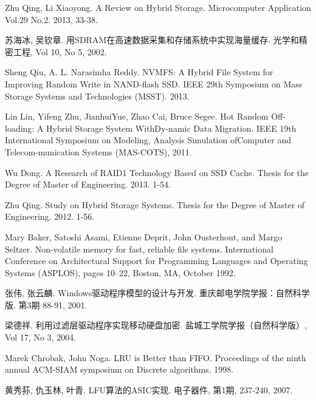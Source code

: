 \begin{thebibliography}
Zhu Qing, Li Xiaoyong. A Review on Hybrid Storage. Microcomputer Application Vol.29 No.2. 2013, 33-38.

苏海冰, 吴钦章. 用SDRAM在高速数据采集和存储系统中实现海量缓存. 光学和精密工程, Vol 10, No 5, 2002.

Sheng Qiu, A. L. Narasimha Reddy. NVMFS: A Hybrid File System for Improving Random Write in NAND-flash SSD. IEEE 29th Symposium on Mass Storage Systems and Technologies (MSST). 2013.

Lin Lin, Yifeng Zhu, JianhuiYue, Zhao Cai, Bruce Segee. Hot Random Off-loading: A Hybrid Storage System WithDy-namic Data Migration. IEEE 19th International Symposium on Modeling, Analysis Simulation ofComputer and Telecom-munication Systems (MAS-COTS), 2011.

Wu Dong. A Research of RAID1 Technology Based on SSD Cache. Thesis for the Degree of Master of Engineering. 2013. 1-54.

Zhu Qing. Study on Hybrid Storage Systems. Thesis for the Degree of Master of Engineering. 2012. 1-56.

Mary Baker, Satoshi Asami, Etienne Deprit, John Ousterhout, and Margo Seltzer. Non-volatile memory for fast, reliable file systems. International Conference on Architectural Support for Programming Languages and Operating Systems (ASPLOS), pages 10–22, Boston, MA, October 1992.

张伟, 张云麟. Windows驱动程序模型的设计与开发. 重庆邮电学院学报：自然科学版. 第3期 88-91, 2001.

梁德祥. 利用过滤层驱动程序实现移动硬盘加密. 盐城工学院学报（自然科学版）, Vol 17, No 3, 2004.

Marek Chrobak, John Noga. LRU is Better than FIFO. Proceedings of the ninth annual ACM-SIAM symposium on Discrete algorithms. 1998.

黄秀荪, 仇玉林, 叶青. LFU算法的ASIC实现. 电子器件, 第1期, 237-240, 2007.

\end{thebibliography}
